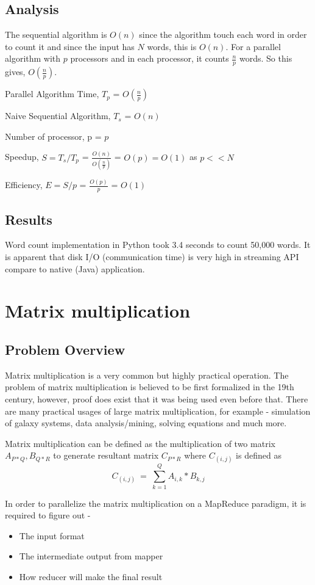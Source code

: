 \documentclass{article}
\begin{document}
\subsection{Analysis}
\BlankLine The sequential algorithm is $O(n)$ since the algorithm touch each word in order to count it and since the input has $N$ words, this is $O(n)$. For a parallel algorithm with $p$ processors and in each processor, it counts $\frac{n}{p}$ words. So this gives, $O(\frac{n}{p})$.


Parallel Algorithm Time, ${T_{p}}$ = $O(\frac{n}{p})$

Naive Sequential Algorithm, ${T_{s}}$ = $O(n)$

Number of processor, p = $p$

Speedup, ${S = T_{s}/T_{p}}$ = $\frac{O(n)}{O(\frac{n}{p})}$ = $O(p) = O(1)$ as $p << N$

Efficiency, ${E = S/p}$ = $\frac{O(p)}{p}$ = $O(1)$

\subsection{Results}
Word count implementation in Python took 3.4 seconds to count 50,000 words. It is apparent that disk I/O (communication time) is very high in streaming API compare to native (Java) application.
\section{Matrix multiplication}

\subsection{Problem Overview}
Matrix multiplication is a very common but highly practical operation. The problem of matrix multiplication is believed to be first formalized in the 19th century, however, proof does exist that it was being used even before that. There are many practical usages of large matrix multiplication, for example - simulation of galaxy systems, data analysis/mining, solving equations and much more.

Matrix multiplication can be defined as the multiplication of two matrix ${A_{P*Q},B_{Q*R}}$ to generate resultant matrix ${C_{P*R}}$ where ${C_{(i,j)}}$ is defined as
\begin{equation}
C_{(i,j)}\ =\ \sum_{k = 1}^{Q} A_{i, k} *  B_{k,j}
\end{equation}

In order to parallelize the matrix multiplication on a MapReduce paradigm, it is required to figure out -
\begin{itemize}
\item The input format
\item The intermediate output from mapper
\item How reducer will make the final result
\end{itemize}
\end{document}
